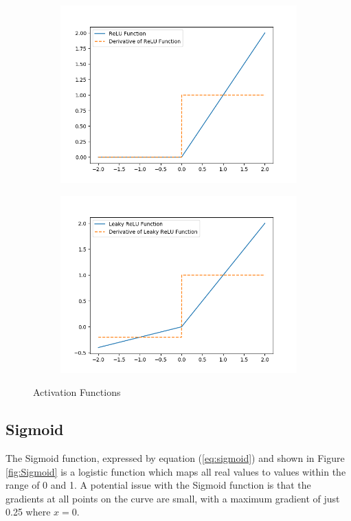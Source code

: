 \begin{figure}[h]
\begin{subfigure}[b]{0.49\textwidth}
        \includegraphics[width=\textwidth]{figures/relu.png}
        \label{fig:ReLU}
    \end{subfigure}
    \begin{subfigure}[b]{0.49\textwidth}
        \includegraphics[width=\textwidth]{figures/lrelu.png}
        \label{fig:LeakyReLU}
    \end{subfigure}
    \caption{Activation Functions}\label{fig:activations}
\end{figure}

\subsection{Sigmoid}
The Sigmoid function, expressed by equation (\ref{eq:sigmoid}) and shown in Figure \ref{fig:Sigmoid} is a logistic function which maps all real values to values within the range of 0 and 1.
A potential issue with the Sigmoid function is that the gradients at all points on the curve are small, with a maximum gradient of just 0.25 where $x = 0$.

